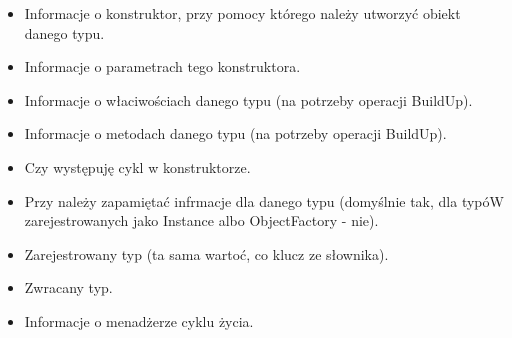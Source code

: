 \documentclass[12pt]{article}
\begin{document}
\begin{itemize}
	\item Informacje o konstruktor, przy pomocy którego należy utworzyć obiekt danego typu.
	\item Informacje o parametrach tego konstruktora.
	\item Informacje o właciwościach danego typu (na potrzeby operacji BuildUp).
	\item Informacje o metodach danego typu (na potrzeby operacji BuildUp).
	\item Czy występuję cykl w konstruktorze.
	\item Przy należy zapamiętać infrmacje dla danego typu (domyślnie tak, dla typóW zarejestrowanych jako Instance albo ObjectFactory - nie).
	\item Zarejestrowany typ (ta sama wartoć, co klucz ze słownika).
	\item Zwracany typ.
	\item Informacje o menadżerze cyklu życia.
\end{itemize}
\end{document}

